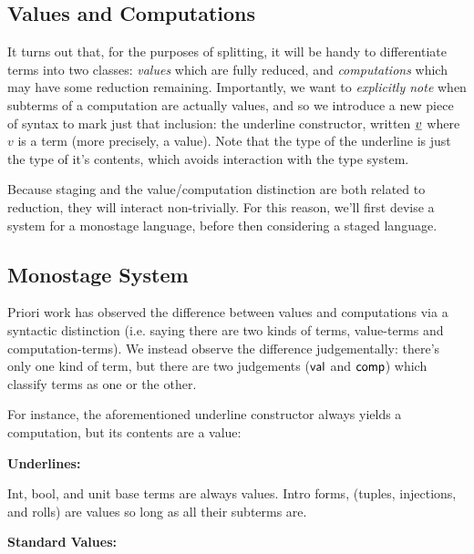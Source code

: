 \documentclass[]{article}
\begin{document}
\begin{abstrsyn}
\section{Values and Computations}

It turns out that, for the purposes of splitting, it will be handy to differentiate terms into two classes: 
\emph{values} which are fully reduced, and \emph{computations} which may have some reduction remaining.
Importantly, we want to \emph{explicitly note} when subterms of a computation are actually values,
and so we introduce a new piece of syntax to mark just that inclusion: the underline constructor, written $\underline{v}$
where $v$ is a term (more precisely, a value).  
Note that the type of the underline is just the type of it's contents, which avoids interaction with the type system.

Because staging and the value/computation distinction are both related to reduction, they will interact non-trivially.
For this reason, we'll first devise a  system for a monostage language, before then considering a staged language.

\subsection{Monostage System}

Priori work has observed the difference between values and computations
via a syntactic distinction (i.e. saying there are two kinds of terms, value-terms and computation-terms).
We instead observe the difference judgementally: there's only one kind of term, 
but there are two judgements ($\mathsf{val}$ and $\mathsf{comp}$) which classify terms as one or the other.

For instance, the aforementioned underline constructor always yields a computation,
but its contents are a value:

\begin{framed}
\noindent\textbf{Underlines:}
\end{framed}

Int, bool, and unit base terms are always values.  
Intro forms, (tuples, injections, and rolls) are values so long as all their subterms are.

\begin{framed}
\noindent\textbf{Standard Values:}
\end{framed}


\end{abstrsyn}
\end{document}
